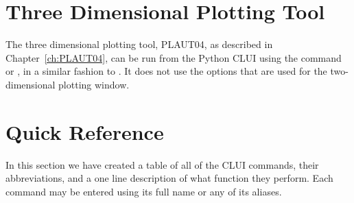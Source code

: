 \documentclass[12pt]{report}
\begin{document}
 \section{Three Dimensional Plotting Tool}

 The \AUTO three dimensional plotting tool, PLAUT04, as described
 in Chapter~\ref{ch:PLAUT04}, can be run from the Python CLUI
 using the command
  or , in a similar
 fashion to . It does not use the options that
 are used for the two-dimensional plotting window.

 \section{ Quick Reference } \label{sec:clui quick reference}

 In this section we have created a table of all of the \AUTO CLUI
 commands, their abbreviations, and a one line description of what
 function they perform.  Each command may be entered using 
 its full name or any of its aliases.
\end{document}
